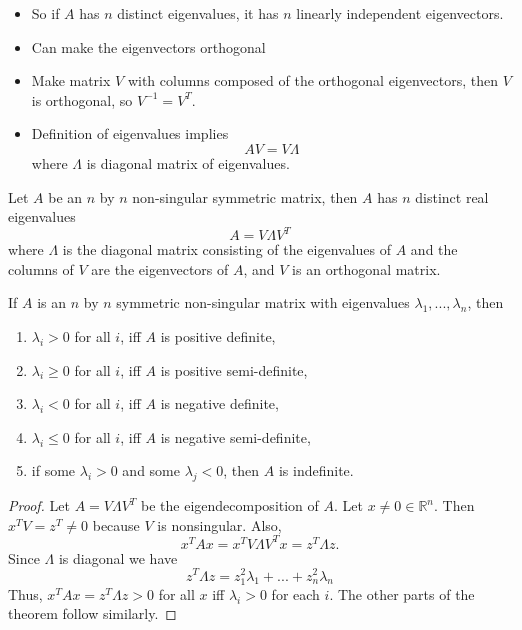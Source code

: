 \documentclass[compress]{beamer}
\def\R{\mathbb{R}}
\begin{document}
\begin{frame}
  \begin{itemize}
  \item So if $A$ has $n$ distinct eigenvalues, it has $n$ linearly
    independent eigenvectors.
  \item Can make the eigenvectors orthogonal
  \item Make matrix $V$ with columns composed of the orthogonal
    eigenvectors, then $V$ is orthogonal, so $V^{-1} = V^T$. 
  \item Definition of eigenvalues implies
    \[ A V = V \Lambda \]
    where $\Lambda$ is diagonal matrix of eigenvalues.
  \end{itemize}
  \begin{theorem}[Eigendecomposition]
    Let $A$ be an $n$ by $n$ non-singular symmetric matrix, then $A$ has
    $n$ distinct real eigenvalues
    \[ A = V \Lambda V^T \]
    where $\Lambda$ is the diagonal matrix consisting of the eigenvalues
    of $A$ and the columns of $V$ are the eigenvectors of $A$, and $V$
    is an orthogonal matrix.  
  \end{theorem}
\end{frame}

\begin{frame}
  \begin{theorem}
    If $A$ is an $n$ by $n$ symmetric non-singular matrix with
    eigenvalues $\lambda_1, ..., \lambda_n$, then
    \begin{enumerate}
    \item $\lambda_i > 0$ for all $i$, iff $A$ is positive definite,
    \item $\lambda_i \geq 0$ for all $i$, iff $A$ is positive semi-definite,
    \item $\lambda_i < 0$ for all $i$, iff $A$ is negative definite,    
    \item $\lambda_i \leq 0$ for all $i$, iff $A$ is negative
      semi-definite,
    \item if some $\lambda_i > 0$ and some $\lambda_j < 0$, then $A$ is
      indefinite.
    \end{enumerate}
  \end{theorem}
\end{frame}
\begin{frame}
  \begin{proof}
    Let $A = V \Lambda V^T$ be the eigendecomposition of $A$. Let $x
    \neq 0 \in \R^n$. Then $x^T V = z^T \neq 0$ because $V$ is
    nonsingular. Also, 
    \[ x^T A x = x^T V \Lambda V^T x = z^T \Lambda z. \]
    Since $\Lambda$ is diagonal we have
    \[ z^T \Lambda z = z_1^2 \lambda_1 + ... + z_n^2 \lambda_n \]
    Thus, $x^T A  x= z^T \Lambda z > 0$ for all $x$ iff $\lambda_i>0$
    for each $i$. The other parts of the theorem follow similarly. 
  \end{proof}
\end{frame}
\end{document}
